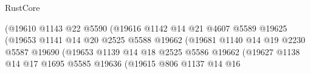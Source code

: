 \begin{lexlean}{RustCore}
\begin{coremodule}
                                              (@19610
                                                @1143
                                                @22
                                                @5590
                                                (@19616
                                                  @1142
                                                  @14
                                                  @21
                                                  @4607
                                                  @5589
                                                  @19625
                                                  (@19653
                                                    @1141
                                                    @14
                                                    @20
                                                    @2525
                                                    @5588
                                                    @19662
                                                    (@19681
                                                      @1140
                                                      @14
                                                      @19
                                                      @2230
                                                      @5587
                                                      @19690
                                                      (@19653
                                                        @1139
                                                        @14
                                                        @18
                                                        @2525
                                                        @5586
                                                        @19662
                                                        (@19627
                                                          @1138
                                                          @14
                                                          @17
                                                          @1695
                                                          @5585
                                                          @19636
                                                          (@19615
                                                            @806
                                                            @1137
                                                            @14
                                                            @16

\end{coremodule}
\end{lexlean}
